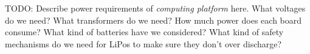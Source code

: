 TODO: Describe power requirements of \textit{computing platform} here. What voltages do we need? What transformers do we need? How much power does each board consume? What kind of batteries have we considered? What kind of safety mechanisms do we need for LiPos to make sure they don't over discharge?